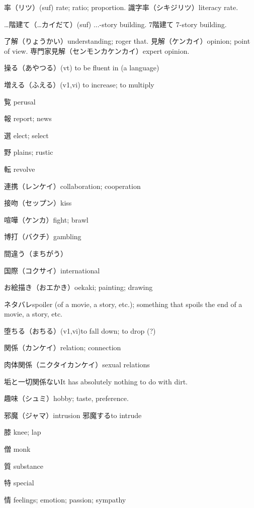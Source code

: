 率（リツ）(suf) rate; ratio; proportion.
識字率（シキジリツ）literacy rate.

…階建て（…カイだて）(suf) ...-story building.
7階建て 7-story building.

了解（りょうかい）understanding; roger that.
見解（ケンカイ）opinion; point of view.
専門家見解（センモンカケンカイ）expert opinion.

操る（あやつる）(vt) to be fluent in (a language)

増える（ふえる）(v1,vi) to increase; to multiply

覧 perusal

報 report; news

選 elect; select

野 plains; rustic

転 revolve

連携（レンケイ）collaboration; cooperation

接吻（セップン）kiss

喧嘩（ケンカ）fight; brawl

博打（バクチ）gambling

間違う（まちがう）

国際（コクサイ）international

お絵描き（おエかき）oekaki; painting; drawing

ネタバレspoiler (of a movie, a story, etc.); something that spoils the end of a movie, a story, etc.

堕ちる（おちる）(v1,vi)to fall down; to drop (?)

関係（カンケイ）relation; connection

肉体関係（ニクタイカンケイ）sexual relations

垢と一切関係ないIt has absolutely nothing to do with dirt.

趣味（シュミ）hobby; taste, preference.

邪魔（ジャマ）intrusion
邪魔するto intrude

膝 knee; lap

僧 monk

質 substance

特 special

情 feelings; emotion; passion; sympathy
